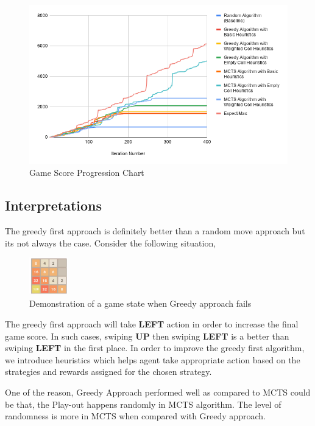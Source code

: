 \documentclass{svproc}
\begin{document}
    \begin{figure}[h!]

        \centering
        \includegraphics[width=1.0\textwidth]{Game Score Progression Chart.png}
        \caption{Game Score Progression Chart}
        \label{game_score_progression_chart}
    \end{figure}

    \subsection{Interpretations}
    The greedy first approach is definitely better than a random move approach but its not always the case.
    Consider the following situation,
    \begin{figure}[h!]

        \centering
        \includegraphics[width=0.15\textwidth]{greedy_img_correction.png}
        \caption{Demonstration of a game state when Greedy approach fails}
    \end{figure}


    The greedy first approach will take \textbf{LEFT} action in order to increase the final game score. In such cases, swiping \textbf{UP} then swiping \textbf{LEFT} is a better than swiping \textbf{LEFT} in the first place. In order to improve the greedy first algorithm, we introduce heuristics which helps agent take appropriate action based on the strategies and rewards assigned for the chosen strategy.

    One of the reason, Greedy Approach performed well as compared to MCTS could be that, the Play-out happens randomly in MCTS algorithm. The level of randomness is more in MCTS when compared with Greedy approach.
\end{document}
